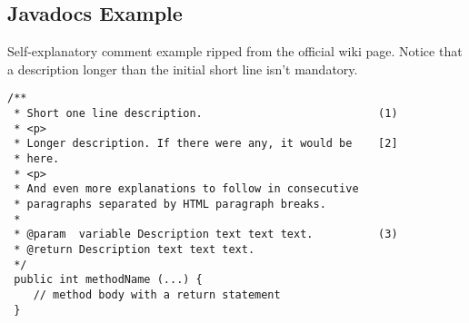 \subsection{Javadocs Example}
Self-explanatory comment example ripped from the official wiki page. Notice that a description longer than the initial short line isn't mandatory.

\begin{lstlisting}
/**
 * Short one line description.                           (1)
 * <p>
 * Longer description. If there were any, it would be    [2]
 * here.
 * <p>
 * And even more explanations to follow in consecutive
 * paragraphs separated by HTML paragraph breaks.
 *
 * @param  variable Description text text text.          (3)
 * @return Description text text text.
 */
 public int methodName (...) {
	// method body with a return statement
 }
\end{lstlisting}